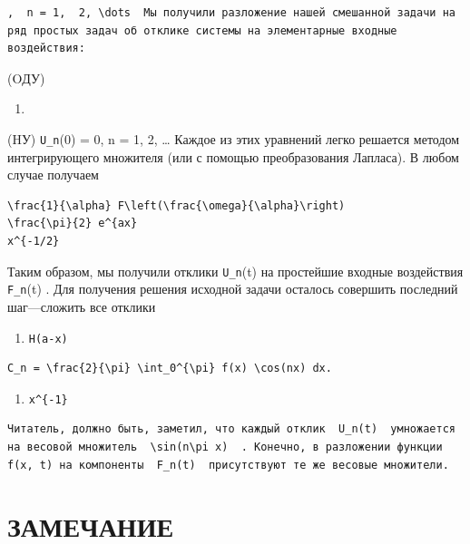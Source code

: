 \documentclass[
  ukrainian,
]{article}
\providecommand{\tightlist}{%
  \setlength{\itemsep}{0pt}\setlength{\parskip}{0pt}}
\begin{document}
\begin{verbatim}
,  n = 1,  2, \dots  Мы получили разложение нашей смешанной задачи на ряд простых задач об отклике системы на элементарные входные воздействия:
\end{verbatim}

(OДУ)

\begin{enumerate}
\def\labelenumi{\arabic{enumi}.}
\tightlist
\item
\end{enumerate}

(HУ) \texttt{U\_n}(0) = 0, n = 1, 2, \ldots{} Каждое из этих уравнений
легко решается методом интегрирующего множителя (или с помощью
преобразования Лапласа). В любом случае получаем

\begin{verbatim}
\frac{1}{\alpha} F\left(\frac{\omega}{\alpha}\right)
\frac{\pi}{2} e^{ax}
x^{-1/2}
\end{verbatim}

Таким образом, мы получили отклики \texttt{U\_n}(t) на простейшие
входные воздействия \texttt{F\_n}(t) . Для получения решения исходной
задачи осталось совершить последний шаг---сложить все отклики

\begin{enumerate}
\def\labelenumi{\arabic{enumi}.}
\setcounter{enumi}{4}
\tightlist
\item
  \texttt{H(a-x)}
\end{enumerate}

\begin{verbatim}
C_n = \frac{2}{\pi} \int_0^{\pi} f(x) \cos(nx) dx.
\end{verbatim}

\begin{enumerate}
\def\labelenumi{\arabic{enumi}.}
\setcounter{enumi}{5}
\tightlist
\item
  \texttt{x\^{}\{-1\}}
\end{enumerate}

\begin{verbatim}
Читатель, должно быть, заметил, что каждый отклик  U_n(t)  умножается на весовой множитель  \sin(n\pi x)  . Конечно, в разложении функции f(x, t) на компоненты  F_n(t)  присутствуют те же весовые множители.
\end{verbatim}

\section{ЗАМЕЧАНИЕ}\label{ux437ux430ux43cux435ux447ux430ux43dux438ux435}
\end{document}
